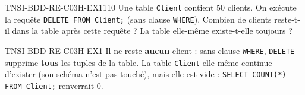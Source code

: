 
\begin{exercice}{TNSI-BDD-RE-C03H-EX1}{1}{10}
Une table \texttt{Client} contient $50$ clients. On exécute la requête \texttt{DELETE FROM Client;} (sans clause \texttt{WHERE}). Combien de clients reste-t-il dans la table après cette requête ? La table elle-même existe-t-elle toujours ?
\end{exercice}


\begin{corrige}{TNSI-BDD-RE-C03H-EX1}
Il ne reste \textbf{aucun} client : sans clause \texttt{WHERE}, \texttt{DELETE} supprime \textbf{tous} les tuples de la table. La table \texttt{Client} elle-même continue d'exister (son schéma n'est pas touché), mais elle est vide : \texttt{SELECT COUNT(*) FROM Client;} renverrait $0$.
\end{corrige}
